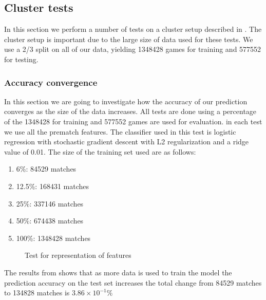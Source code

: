 \subsection{Cluster tests}\label{sec:clustertest}
In this section we perform a number of tests on a cluster setup described in . The cluster setup is important due to the large size of data used for these tests.
We use a 2/3 split on all of our data, yielding 1348428 games for training and 577552 for testing.


\subsubsection{Accuracy convergence}
In this section we are going to investigate how the accuracy of our prediction converges as the size of the data increases.
All tests are done using a percentage of the 1348428 for training and 577552 games are used for evaluation. in each test we use all the prematch features. The classifier used in this test is logistic regression with stochastic gradient descent with L2 regularization and a ridge value of 0.01. The size of the training set used are as follows: 
\begin{enumerate}
\item 6\%: 84529 matches
\item 12.5\%: 168431 matches 
\item 25\%: 337146 matches 
\item 50\%: 674438 matches
\item 100\%: 1348428 matches 
\end{enumerate}
\begin{figure}[!htb]
  \centering
{}
  \caption{Test for representation of features}\label{fig:clusterbigdata}
\end{figure}
The results from  shows that as more data is used to train the model the prediction accuracy on the test set increases the total change from 84529 matches to 134828 matches is $3.86\times10^{-1}\%$

